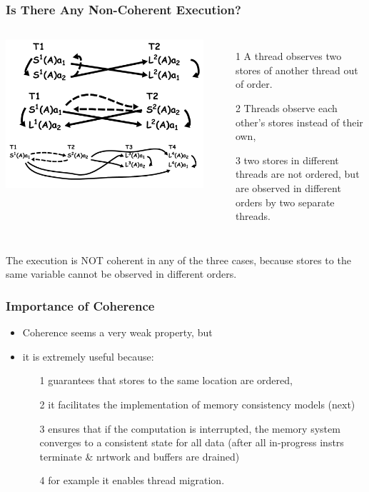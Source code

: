 \documentclass{beamer}
\begin{document}
\begin{frame}[fragile,t]
\frametitle{Is There Any Non-Coherent Execution?}

\begin{columns}
\includegraphics[width=44ex]{Ch7Figs/NonCoherentExecs}%

\begin{itemize}
    \item[1] A thread observes two stores of another thread out of order.
    \item[2] Threads observe each other's stores instead of their own,
    \item[3] two stores in different threads are not ordered, but are 
                observed in different orders by two separate threads.
\end{itemize}
\end{columns}
\bigskip

\alert{The execution is NOT coherent in any of the three cases, because
stores to the same variable cannot be observed in different orders.}

\end{frame}

\begin{frame}[fragile,t]
\frametitle{Importance of Coherence}

\begin{itemize}
    \item Coherence seems a very weak property, but
    \item it is extremely useful because:\medskip
    \begin{itemize}
        \item[1] guarantees that stores to the same location are ordered,\medskip
        \item[2] it facilitates the implementation of memory consistency
                    models (next)\medskip
        \item[3] ensures that if the computation is interrupted, the memory
                    system converges to a consistent state for all data
                    (after all in-progress instrs terminate \& nrtwork 
                    and buffers are drained)\medskip
        \item[4] for example it enables thread migration.
    \end{itemize}

\end{itemize}

\end{frame}
\end{document}
